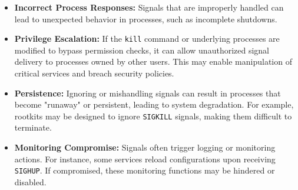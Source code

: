 \begin{itemize}
    \item \textbf{Incorrect Process Responses:} Signals that are improperly handled can lead to unexpected behavior in processes, such as incomplete shutdowns.
    \item \textbf{Privilege Escalation:} If the \texttt{kill} command or underlying processes are modified to bypass permission checks, it can allow unauthorized signal delivery to processes owned by other users. This may enable manipulation of critical services and breach security policies.
    \item \textbf{Persistence:} Ignoring or mishandling signals can result in processes that become "runaway" or persistent, leading to system degradation. For example, rootkits may be designed to ignore \texttt{SIGKILL} signals, making them difficult to terminate.
    \item \textbf{Monitoring Compromise:} Signals often trigger logging or monitoring actions. For instance, some services reload configurations upon receiving \texttt{SIGHUP}. If compromised, these monitoring functions may be hindered or disabled.
\end{itemize}
